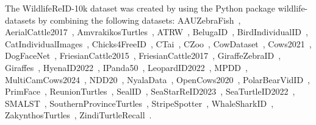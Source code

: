 \documentclass{article}
\begin{document}
The WildlifeReID-10k dataset was created by using the Python package wildlife-datasets \cite{Cermak_2024_WACV} by combining the following datasets:
AAUZebraFish~\cite{bruslund2020re},
AerialCattle2017~\cite{andrew2017visual},
AmvrakikosTurtles~\cite{adam2024exploiting},
ATRW~\cite{li2019atrw},
BelugaID~\cite{belugaid},
BirdIndividualID~\cite{ferreira2020deep},
CatIndividualImages~\cite{catindividuals},
Chicks4FreeID~\cite{kern2024towards},
CTai~\cite{freytag2016chimpanzee},
CZoo~\cite{freytag2016chimpanzee},
CowDataset~\cite{cowdataset},
Cows2021~\cite{gao2021towards},
DogFaceNet~\cite{mougeot2019deep},
FriesianCattle2015~\cite{andrew2016automatic},
FriesianCattle2017~\cite{andrew2017visual},
GiraffeZebraID~\cite{parham2017animal},
Giraffes~\cite{miele2021revisiting},
HyenaID2022~\cite{botswana2022},
IPanda50~\cite{wang2021giant},
LeopardID2022~\cite{botswana2022},
MPDD~\cite{he2023animal},
MultiCamCows2024~\cite{yu2024multicamcows2024},
NDD20~\cite{trotter2020ndd20},
NyalaData~\cite{dlamini2020automated},
OpenCows2020~\cite{andrew2021visual},
PolarBearVidID~\cite{zuerl2023polarbearvidid},
PrimFace~\cite{primface},
ReunionTurtles~\cite{adam2024exploiting},
SealID~\cite{nepovinnykh2022sealid},
SeaStarReID2023~\cite{wahltinez2024open},
SeaTurtleID2022~\cite{adam2024seaturtleid},
SMALST~\cite{zuffi2019three},
SouthernProvinceTurtles~\cite{adam2024exploiting},
StripeSpotter~\cite{lahiri2011biometric},
WhaleSharkID~\cite{holmberg2009estimating},
ZakynthosTurtles~\cite{adam2024exploiting},
ZindiTurtleRecall~\cite{zinditurtles}.



\end{document}
